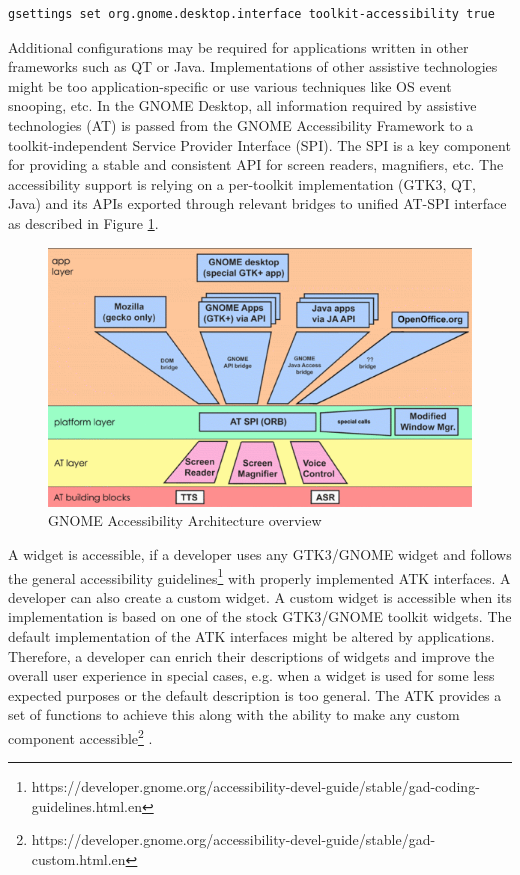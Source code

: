 \begin{lstlisting}[numbers=none,caption={Enabling accessibility via a \texttt{gsettings} command},label={gsettings}]
gsettings set org.gnome.desktop.interface toolkit-accessibility true
\end{lstlisting}

Additional configurations may be required for applications written in other frameworks such as QT or Java. Implementations of other assistive technologies might be too application-specific or use various techniques like OS event snooping, etc. In the GNOME Desktop, all information required by assistive technologies (AT) is passed from the GNOME Accessibility Framework to a toolkit-independent Service Provider Interface (SPI). The SPI is a key component for providing a stable and consistent API for screen readers, magnifiers, etc. The accessibility support is relying on a per-toolkit implementation (GTK3, QT, Java) and its APIs exported through relevant bridges to unified AT-SPI interface as described in Figure \ref{ATSPI_architecture}.

\begin{figure}[hbt]
	\centering
	\includegraphics[width=1\textwidth]{obrazky-figures/GNOME_desktop_Accessibility.png}
	\caption{GNOME Accessibility Architecture overview\cite{gnomeADG}}
	\label{ATSPI_architecture}
\end{figure}

A widget is accessible, if a developer uses any GTK3/GNOME widget and follows the general accessibility guidelines\footnote{https://developer.gnome.org/accessibility-devel-guide/stable/gad-coding-guidelines.html.en} with properly implemented ATK interfaces. A developer can also create a custom widget. A custom widget is accessible when its implementation is based on one of the stock GTK3/GNOME toolkit widgets. The default implementation of the ATK interfaces might be altered by applications. Therefore, a developer can enrich their descriptions of widgets and improve the overall user experience in special cases, e.g. when a widget is used for some less expected purposes or the default description is too general. The ATK provides a set of functions to achieve this along with the ability to make any custom component accessible\footnote{https://developer.gnome.org/accessibility-devel-guide/stable/gad-custom.html.en} \cite{accessibleWidgets}.


